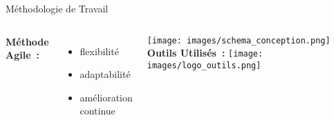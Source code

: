 \begin{frame}{Méthodologie de Travail}
  \begin{columns}[t]
    \textbf{Méthode Agile~:}\\[0.4cm]
    \hspace*{-0.4cm}
    \vspace*{-1cm}
    \begin{itemize}
        \item flexibilité
        \item adaptabilité
        \item amélioration continue
    \end{itemize}
    \texttt{[image: images/schema\_conception.png]}
    \textbf{Outils Utilisés~:}
    \hspace*{0.2cm}
    \texttt{[image: images/logo\_outils.png]}
  \end{columns}
\end{frame}